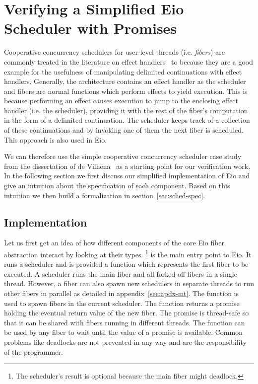 \section{Verifying a Simplified Eio Scheduler with Promises}
\label{sec:scheduler}


Cooperative concurrency schedulers for user-level threads (i.e. \emph{fibers}) are commonly treated in the literature
on effect handlers~\cite{dolan2018concurrent,leijen2017structured,de2021separation} to because they are a good example for the usefulness
of manipulating delimited continuations with effect handlers.
Generally, the architecture contains an effect handler as the scheduler and fibers are normal functions which perform effects to yield execution.
This is because performing an effect causes execution to jump to the enclosing effect handler (i.e. the scheduler), providing it with the rest of the fiber's computation in the form of a delimited continuation.
The scheduler keeps track of a collection of these continuations and by invoking one of them the next fiber is scheduled.
This approach is also used in Eio.

We can therefore use the simple cooperative concurrency scheduler case study from the dissertation of de Vilhena~\cite{de2022proof} as a starting point for our verification work.
In the following section we first discuss our simplified implementation of Eio and give an intuition about the specification of each component.
Based on this intuition we then build a formalization in section~\ref{sec:sched-spec}.

\subsection{Implementation}
\label{sec:sched-impl}

Let us first get an idea of how different components of the core Eio fiber abstraction interact by looking at their types.
\footnote{The scheduler's result is optional because the main fiber might deadlock.} is the main entry point to Eio.
It runs a scheduler and is provided a function which represents the first fiber to be executed.
A scheduler runs the main fiber and all forked-off fibers in a single thread.
However, a fiber can also spawn new schedulers in separate threads to run other fibers in parallel as detailed in appendix~\ref{sec:apdx-mt}.
The  function is used to spawn fibers in the current scheduler.
The function returns a promise holding the eventual return value of the new fiber.
The promise is thread-safe so that it can be shared with fibers running in different threads.
The  function can be used by any fiber to wait until the value of a promise is available.
Common problems like deadlocks are not prevented in any way and are the responsibility of the programmer.

